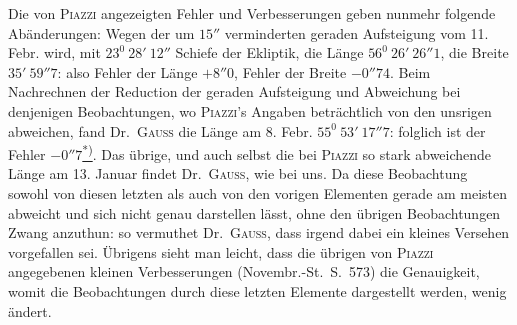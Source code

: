 \par\indent Die von \textsc{Piazzi} angezeigten Fehler und Verbesserungen geben nunmehr folgende Abänderungen: Wegen der um $15''$ verminderten geraden Aufsteigung vom 11. Febr. wird, mit $23^0\ 28'\ 12''$ Schiefe der Ekliptik, die Länge $56^0\ 26'\ 26''1$, die Breite $35'\ 59''7$: also Fehler der Länge $+8''0$, Fehler der Breite $-0''74$. Beim Nachrechnen der Reduction der geraden Aufsteigung und Abweichung bei denjenigen Beobachtungen, wo \textsc{Piazzi}'s Angaben beträchtlich von den unsrigen abweichen, fand Dr.\ \textsc{Gauss} die Länge am 8. Febr. $55^0\ 53'\ 17''7$: folglich ist der Fehler $-0''7$\hyperlink{native-207-note}{\textsuperscript{*)}}. Das übrige, und auch selbst die bei \textsc{Piazzi} so stark abweichende Länge am 13. Januar findet Dr.\ \textsc{Gauss}, wie bei uns. Da diese Beobachtung sowohl von diesen letzten als auch von den vorigen Elementen gerade am meisten abweicht und sich nicht genau darstellen lässt, ohne den übrigen Beobachtungen Zwang anzuthun: so vermuthet Dr.\ \textsc{Gauss}, dass irgend dabei ein kleines Versehen vorgefallen sei. Übrigens sieht man leicht, dass die übrigen von \textsc{Piazzi} angegebenen kleinen Verbesserungen (Novembr.-St.\ S.\ 573) die Genauigkeit, womit die Beobachtungen durch diese letzten Elemente dargestellt werden, wenig ändert.

